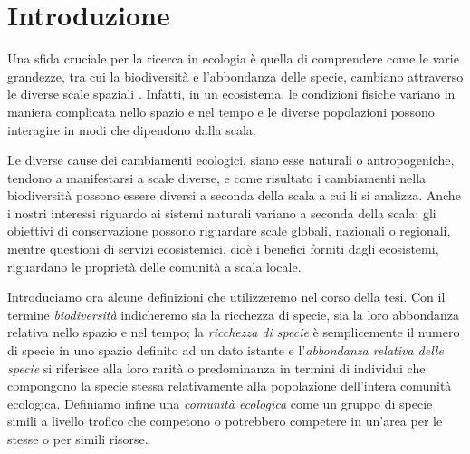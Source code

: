 \chapter*{Introduzione}
Una sfida cruciale per la ricerca in ecologia è quella di comprendere come le varie grandezze, tra cui la biodiversità e l'abbondanza delle specie, cambiano attraverso le diverse scale spaziali \cite{doi:10.1111/2041-210X.12319}. Infatti, in un ecosistema, le condizioni fisiche variano in maniera complicata nello spazio e nel tempo e le diverse popolazioni possono interagire in modi che dipendono dalla scala.

Le diverse cause dei cambiamenti ecologici, siano esse naturali o antropogeniche, tendono a manifestarsi a scale diverse, e come risultato i cambiamenti nella biodiversità possono essere diversi a seconda della scala a cui li si analizza. Anche i nostri interessi riguardo ai sistemi naturali variano a seconda della scala; gli obiettivi di conservazione possono riguardare scale globali, nazionali o regionali, mentre questioni di servizi ecosistemici, cioè i benefici forniti dagli ecosistemi, riguardano le proprietà delle comunità a scala locale.

Introduciamo ora alcune definizioni che utilizzeremo nel corso della tesi. Con il termine \emph{biodiversità} indicheremo sia la ricchezza di specie, sia la loro abbondanza relativa nello spazio e nel tempo; la \emph{ricchezza di specie} è semplicemente il numero di specie in uno spazio definito ad un dato istante e l'\emph{abbondanza relativa delle specie} si riferisce alla loro rarità o predominanza in termini di individui che compongono la specie stessa relativamente alla popolazione dell'intera comunità ecologica. Definiamo infine una \emph{comunità ecologica} come un gruppo di specie simili a livello trofico che competono o potrebbero competere in un'area per le stesse o per simili risorse. 
 
